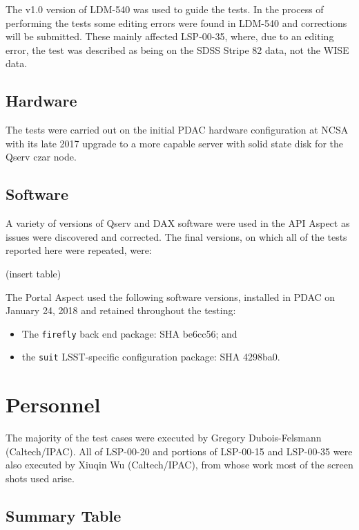 \documentclass[DM,lsstdraft,STR,toc]{lsstdoc}
\begin{document}
The v1.0 version of LDM-540 was used to guide the tests.
In the process of performing the tests some editing errors were found in LDM-540 and corrections will be submitted.
These mainly affected LSP-00-35, where, due to an editing error,
the test was described as being on the SDSS Stripe 82 data, not the WISE data.

\subsection{Hardware}

The tests were carried out on the initial PDAC hardware configuration at NCSA with its late 2017 upgrade to a more capable server with solid state disk for the Qserv czar node.

\subsection{Software}

A variety of versions of Qserv and DAX software were used in the API Aspect as issues were discovered and corrected.
The final versions, on which all of the tests reported here were repeated, were:

(insert table)

The Portal Aspect used the following software versions, installed in PDAC on January 24, 2018 and retained throughout the testing:

\begin{itemize}
\item{The \verb|firefly| back end package: SHA be6cc56; and}
\item{the \verb|suit| LSST-specific configuration package: SHA 4298ba0.}
\end{itemize}


\section{Personnel}
\label{sect:personnel}

The majority of the test cases were executed by Gregory Dubois-Felsmann (Caltech/IPAC).
All of LSP-00-20 and portions of LSP-00-15 and LSP-00-35 were also executed by Xiuqin Wu (Caltech/IPAC),
from whose work most of the screen shots used arise.


\subsection{Summary Table}
\label{sect:summarytable}
\end{document}
